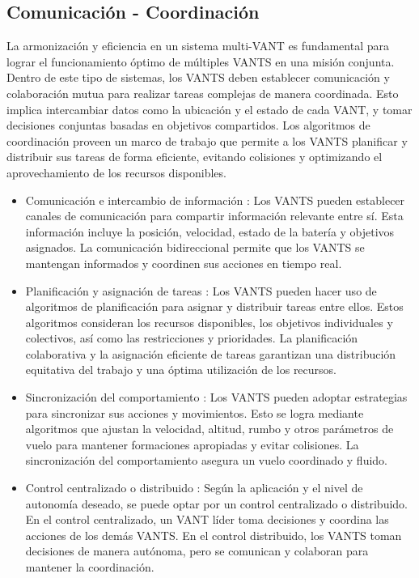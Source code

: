 \documentclass[sigconf]{acmart}
\begin{document}
\subsection*{Comunicación - Coordinación}

La armonización y eficiencia en un sistema multi-VANT es fundamental para lograr el funcionamiento óptimo de múltiples VANTS en una misión conjunta. Dentro de este tipo de sistemas, los VANTS deben establecer comunicación y colaboración mutua para realizar tareas complejas de manera coordinada. Esto implica intercambiar datos como la ubicación y el estado de cada VANT, y tomar decisiones conjuntas basadas en objetivos compartidos. Los algoritmos de coordinación proveen un marco de trabajo que permite a los VANTS planificar y distribuir sus tareas de forma eficiente, evitando colisiones y optimizando el aprovechamiento de los recursos disponibles. %

\begin{itemize}
\item Comunicación e intercambio de información \cite{UAVConn}: Los VANTS pueden establecer canales de comunicación para compartir información relevante entre sí. Esta información incluye la posición, velocidad, estado de la batería y objetivos asignados. La comunicación bidireccional permite que los VANTS se mantengan informados y coordinen sus acciones en tiempo real.
\item Planificación y asignación de tareas \cite{CAT}: Los VANTS pueden hacer uso de algoritmos de planificación para asignar y distribuir tareas entre ellos. Estos algoritmos consideran los recursos disponibles, los objetivos individuales y colectivos, así como las restricciones y prioridades. La planificación colaborativa y la asignación eficiente de tareas garantizan una distribución equitativa del trabajo y una óptima utilización de los recursos.
\item Sincronización del comportamiento \cite{CCN}: Los VANTS pueden adoptar estrategias para sincronizar sus acciones y movimientos. Esto se logra mediante algoritmos que ajustan la velocidad, altitud, rumbo y otros parámetros de vuelo para mantener formaciones apropiadas y evitar colisiones. La sincronización del comportamiento asegura un vuelo coordinado y fluido.
\item Control centralizado o distribuido \cite{CDUAV}: Según la aplicación y el nivel de autonomía deseado, se puede optar por un control centralizado o distribuido. En el control centralizado, un VANT líder toma decisiones y coordina las acciones de los demás VANTS. En el control distribuido, los VANTS toman decisiones de manera autónoma, pero se comunican y colaboran para mantener la coordinación.
\end{itemize}
\end{document}
